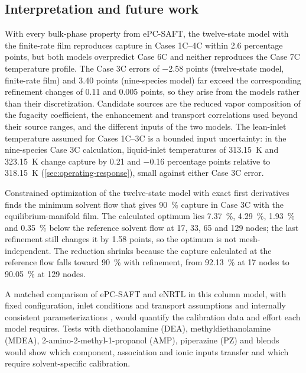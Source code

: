 \subsection{Interpretation and future work}
With every bulk-phase property from ePC-SAFT, the twelve-state model with the finite-rate film reproduces capture in Cases 1C--4C within \num{2.6} percentage points, but both models overpredict Case 6C and neither reproduces the Case 7C temperature profile.
The Case 3C errors of \num{-2.58} points (twelve-state model, finite-rate film) and \num{+3.40} points (nine-species model) far exceed the corresponding refinement changes of \num{0.11} and \num{0.005} points, so they arise from the models rather than their discretization.
Candidate sources are the reduced vapor composition of the \COtwo{} fugacity coefficient, the enhancement and transport correlations used beyond their source ranges, and the different inputs of the two models.
The lean-inlet temperature assumed for Cases 1C--3C is a bounded input uncertainty: in the nine-species Case 3C calculation, liquid-inlet temperatures of \qty{313.15}{K} and \qty{323.15}{K} change capture by \num{+0.21} and \num{-0.16} percentage points relative to \qty{318.15}{K} (\cref{sec:operating-response}), small against either Case 3C error.

Constrained optimization of the twelve-state model with exact first derivatives finds the minimum solvent flow that gives \qty{90}{\percent} capture in Case 3C with the equilibrium-manifold film.
The calculated optimum lies \qty{7.37}{\percent}, \qty{4.29}{\percent}, \qty{1.93}{\percent} and \qty{0.35}{\percent} below the reference solvent flow at 17, 33, 65 and 129 nodes; the last refinement still changes it by \num{1.58} points, so the optimum is not mesh-independent.
The reduction shrinks because the capture calculated at the reference flow falls toward \qty{90}{\percent} with refinement, from \qty{92.13}{\percent} at 17 nodes to \qty{90.05}{\percent} at 129 nodes.

A matched comparison of ePC-SAFT and eNRTL in this column model, with fixed configuration, inlet conditions and transport assumptions and internally consistent parameterizations \cite{Akula2023a,Zhang2011}, would quantify the calibration data and effort each model requires.
Tests with diethanolamine (DEA), methyldiethanolamine (MDEA), 2-amino-2-methyl-1-propanol (AMP), piperazine (PZ) and blends would show which component, association and ionic inputs transfer and which require solvent-specific calibration.
